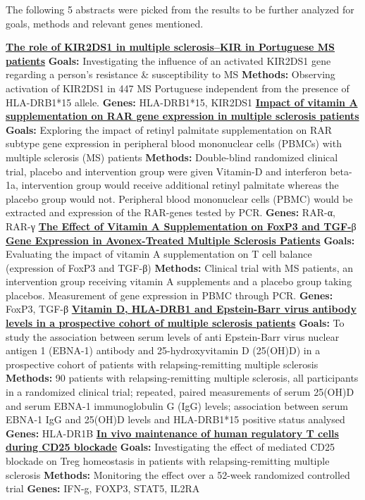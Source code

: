 \documentclass[12pt]{article}
\begin{document}
The following 5 abstracts were picked from the results to be further analyzed for goals, methods
and relevant genes mentioned.
\begin{outline}
    \1 \ul{\textbf{The role of KIR2DS1 in multiple sclerosis--KIR in Portuguese MS patients}}\cite{killercells}
      \2 \textbf{Goals:} Investigating the influence of an activated KIR2DS1 gene regarding a person's resistance \& susceptibility to MS
      \2 \textbf{Methods:} Observing activation of KIR2DS1 in 447 MS Portuguese independent from the presence of HLA-DRB1*15 allele.
      \2 \textbf{Genes:} HLA-DRB1*15, KIR2DS1
    \1 \ul{\textbf{Impact of vitamin A supplementation on RAR gene expression in multiple sclerosis patients}}\cite{vitaminA}
      \2 \textbf{Goals:} Exploring the impact of retinyl palmitate supplementation on RAR subtype gene expression in peripheral blood mononuclear cells (PBMCs) with multiple sclerosis (MS) patients
      \2 \textbf{Methods:} Double-blind randomized clinical trial, placebo and intervention group were given Vitamin-D and interferon beta-1a, intervention group would receive
      additional retinyl palmitate whereas the placebo group would not. Peripheral blood mononuclear cells (PBMC) would be extracted and expression of the RAR-genes tested by PCR.
      \2 \textbf{Genes:} RAR-α, RAR-γ
\newpage
    \1 \ul{\textbf{The Effect of Vitamin A Supplementation on FoxP3 and TGF-}}β \ul{\textbf{Gene Expression in Avonex-Treated Multiple Sclerosis Patients}}\cite{vitaminA2}
      \2 \textbf{Goals:} Evaluating the impact of vitamin A supplementation on T cell balance (expression of FoxP3 and TGF-β)
      \2 \textbf{Methods:} Clinical trial with MS patients, an intervention group receiving vitamin A supplements and a placebo group taking placebos.
      Measurement of gene expression in PBMC through PCR.
      \2 \textbf{Genes:} FoxP3, TGF-β
    \1 \ul{\textbf{Vitamin D, HLA-DRB1 and Epstein-Barr virus antibody levels in a prospective cohort of multiple sclerosis patients}}\cite{epbarr}
      \2 \textbf{Goals:} To study the association between serum levels of anti Epstein-Barr virus nuclear antigen 1 (EBNA-1) antibody and 25-hydroxyvitamin D (25(OH)D) in a prospective cohort of patients with relapsing-remitting multiple sclerosis
      \2 \textbf{Methods:} 90 patients with relapsing-remitting multiple sclerosis, all participants in a randomized clinical trial; 
      repeated, paired measurements of serum 25(OH)D and serum EBNA-1 immunoglobulin G (IgG) levels;
      association between serum EBNA-1 IgG and 25(OH)D levels and HLA-DRB1*15 positive status analysed 
      \2 \textbf{Genes:} HLA-DR1B
    \1 \ul{\textbf{In vivo maintenance of human regulatory T cells during CD25 blockade}}\cite{tcells}
      \2 \textbf{Goals:} Investigating the effect of mediated CD25 blockade on Treg homeostasis in patients with relapsing-remitting multiple sclerosis
      \2 \textbf{Methods:} Monitoring the effect over a 52-week randomized controlled trial
      \2 \textbf{Genes:} IFN-g, FOXP3, STAT5, IL2RA
\end{outline}
\end{document}

